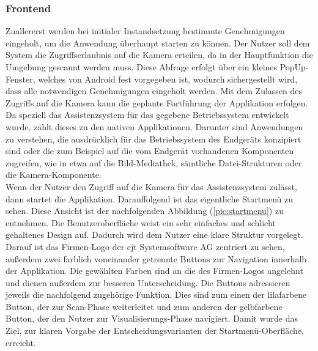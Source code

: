\subsubsection{Frontend}
Zuallererst werden bei initialer Instandsetzung bestimmte Genehmigungen eingeholt, um die Anwendung überhaupt starten zu können. Der Nutzer soll 
dem System die Zugriffserlaubnis auf die Kamera erteilen, da in der Hauptfunktion die Umgebung gescannt werden muss. 
Diese Abfrage erfolgt über ein kleines PopUp-Fenster, welches von Android fest vorgegeben ist, wodurch sichergestellt wird, dass alle notwendigen 
Genehmigungen eingeholt werden. Mit dem Zulassen des Zugriffs auf die Kamera kann die geplante Fortführung der Applikation erfolgen. 
\\ 
\linebreak
Da speziell das Assistenzsystem für das gegebene Betriebssystem entwickelt wurde, zählt dieses zu den nativen Applikationen. 
Darunter sind Anwendungen zu verstehen, die ausdrücklich für das Betriebssystem des Endgeräts konzipiert sind oder die zum Beispiel auf die vom Endgerät vorhandenen 
Komponenten zugreifen, wie in etwa auf die Bild-Mediathek, sämtliche Datei-Strukturen oder die Kamera-Komponente.
\\ 
\linebreak
Wenn der Nutzer den Zugriff auf die Kamera für das Assistenzsystem zulässt, dann startet die Applikation. %
Darauffolgend ist das eigentliche Startmenü zu sehen. Diese Ansicht ist der nachfolgenden Abbildung (\ref{pic:startmenu}) zu entnehmen. Die 
Benutzeroberfläche weist ein sehr einfaches und schlicht gehaltenes Design auf. Dadurch wird dem Nutzer eine klare Struktur vorgelegt. 
\\ 
Darauf ist das Firmen-Logo der cjt Systemsoftware AG zentriert zu sehen, außerdem zwei farblich voneinander getrennte Buttons zur Navigation innerhalb der Applikation. 
Die gewählten Farben sind an die des Firmen-Logos angelehnt und dienen außerdem zur besseren Unterscheidung. 
Die Buttons adressieren jeweils die nachfolgend zugehörige Funktion. Dies sind zum einen der lilafarbene Button, der zur Scan-Phase weiterleitet und zum anderen der 
gelbfarbene Button, der den Nutzer zur Visualisierungs-Phase navigiert. Damit wurde das Ziel, zur klaren Vorgabe der Entscheidungsvarianten der Startmenü-Oberfläche, 
erreicht.
